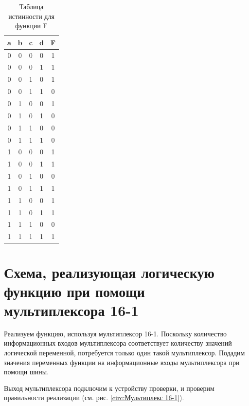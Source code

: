 \documentclass{mirea}
\begin{document}
\begin{table}[h!]
	\centering
	\caption{Таблица истинности для функции F}
	\label{table:Таблица истинности}
	\begin{tabular}{c|c|c|c|c}
		\textbf{a} & \textbf{b} & \textbf{c} & \textbf{d} & \textbf{F} \\
		\hline
		0 & 0 & 0 & 0 & 1 \\
		\hline
		0 & 0 & 0 & 1 & 1 \\
		\hline
		0 & 0 & 1 & 0 & 1 \\
		\hline
		0 & 0 & 1 & 1 & 0 \\
		\hline
		0 & 1 & 0 & 0 & 1 \\
		\hline
		0 & 1 & 0 & 1 & 0 \\
		\hline
		0 & 1 & 1 & 0 & 0 \\
		\hline
		0 & 1 & 1 & 1 & 0 \\
		\hline
		1 & 0 & 0 & 0 & 1 \\
		\hline
		1 & 0 & 0 & 1 & 1 \\
		\hline
		1 & 0 & 1 & 0 & 0 \\
		\hline
		1 & 0 & 1 & 1 & 1 \\
		\hline
		1 & 1 & 0 & 0 & 1 \\
		\hline
		1 & 1 & 0 & 1 & 1 \\
		\hline
		1 & 1 & 1 & 0 & 0 \\
		\hline
		1 & 1 & 1 & 1 & 1 \\
	\end{tabular}
\end{table}

\section{Схема, реализующая логическую функцию при помощи мультиплексора 16-1}
Реализуем функцию, используя мультиплексор 16-1. Поскольку количество информационных входов мультиплексора соответствует количеству значений логической переменной, потребуется только один такой мультиплексор. Подадим значения переменных функции на информационные входы мультиплексора при помощи шины.

Выход мультиплексора подключим к устройству проверки, и проверим правильности реализации (см. рис. \ref{circ:Мультиплекс 16-1}).
\end{document}
